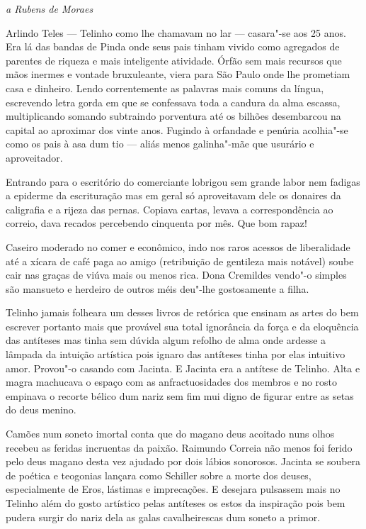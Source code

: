 \hfill{}\emph{a Rubens de Moraes}\bigskip

\noindent{}Arlindo Teles --- Telinho como lhe chamavam no lar --- casara"-se aos 25
anos. Era lá das bandas de Pinda onde seus pais tinham vivido como
agregados de parentes de riqueza e mais inteligente atividade. Órfão sem
mais recursos que mãos inermes e vontade bruxuleante, viera para São
Paulo onde lhe prometiam casa e dinheiro. Lendo correntemente as
palavras mais comuns da língua, escrevendo letra gorda em que se
confessava toda a candura da alma escassa, multiplicando somando
subtraindo porventura até os bilhões desembarcou na capital ao aproximar
dos vinte anos. Fugindo à orfandade e penúria acolhia"-se como os pais à
asa dum tio --- aliás menos galinha"-mãe que usurário e aproveitador.

Entrando para o escritório do comerciante lobrigou sem grande labor nem
fadigas a epiderme da escrituração mas em geral só aproveitavam dele os
donaires da caligrafia e a rijeza das pernas. Copiava cartas, levava a
correspondência ao correio, dava recados percebendo cinquenta por mês.
Que bom rapaz!

Caseiro moderado no comer e econômico, indo nos raros acessos de
liberalidade até a xícara de café paga ao amigo (retribuição de
gentileza mais notável) soube cair nas graças de viúva mais ou menos
rica. Dona Cremildes vendo"-o simples são mansueto e herdeiro de outros
méis deu"-lhe gostosamente a filha.

Telinho jamais folheara um desses livros de retórica que ensinam as
artes do bem escrever portanto mais que provável sua total ignorância da
força e da eloquência das antíteses mas tinha sem dúvida algum refolho
de alma onde ardesse a lâmpada da intuição artística pois ignaro das
antíteses tinha por elas intuitivo amor. Provou"-o casando com Jacinta. E
Jacinta era a antítese de Telinho. Alta e magra machucava o espaço com
as anfractuosidades dos membros e no rosto empinava o recorte bélico dum
nariz sem fim mui digno de figurar entre as setas do deus menino.

Camões num soneto imortal conta que do magano deus acoitado nuns olhos
recebeu as feridas incruentas da paixão. Raimundo Correia não menos foi
ferido pelo deus magano desta vez ajudado por dois lábios sonorosos.
Jacinta se soubera de poética e teogonias lançara como Schiller sobre a
morte dos deuses, especialmente de Eros, lástimas e imprecações. E
desejara pulsassem mais no Telinho além do gosto artístico pelas
antíteses os estos da inspiração pois bem pudera surgir do nariz dela as
galas cavalheirescas dum soneto a primor.

